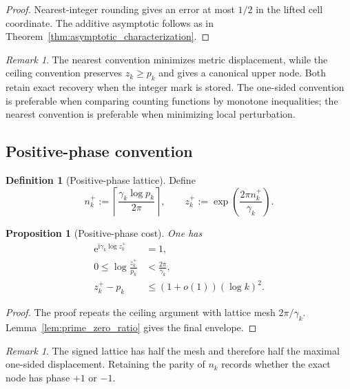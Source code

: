 \documentclass[11pt]{amsart}
\numberwithin{equation}{section}
\theoremstyle{plain}
\newtheorem{proposition}[theorem]{Proposition}
\theoremstyle{definition}
\newtheorem{definition}[theorem]{Definition}
\theoremstyle{remark}
\newtheorem{remark}[theorem]{Remark}
\newcommand{\e}{\mathrm e}
\newcommand{\ii}{\mathrm i}
\begin{document}
\begin{proof}
Nearest-integer rounding gives an error at most $1/2$ in the lifted cell
coordinate.  The additive asymptotic follows as in
Theorem~\ref{thm:asymptotic_characterization}.
\end{proof}

\begin{remark}
\label{rem:choice_comparison}
The nearest convention minimizes metric displacement, while the ceiling
convention preserves $z_k\geq p_k$ and gives a canonical upper node.  Both
retain exact recovery when the integer mark is stored.  The one-sided
convention is preferable when comparing counting functions by monotone
inequalities; the nearest convention is preferable when minimizing local
perturbation.
\end{remark}

\subsection{Positive-phase convention}
\label{subsec:positive_phase}

\begin{definition}[Positive-phase lattice]
\label{def:positive_phase_lattice}
Define
\begin{equation}
 n_k^{+}
 :=\left\lceil\frac{\gamma_k\log p_k}{2\pi}\right\rceil,
 \qquad
 z_k^{+}
 :=\exp\left(\frac{2\pi n_k^{+}}{\gamma_k}\right).
 \label{eq:positive_phase_definition}
\end{equation}
\end{definition}

\begin{proposition}[Positive-phase cost]
\label{prop:positive_phase_cost}
One has
\begin{align}
 \e^{\ii\gamma_k\log z_k^{+}}&=1,
 \label{eq:positive_phase_identity}
 \\
 0\leq\log\frac{z_k^{+}}{p_k}&<\frac{2\pi}{\gamma_k},
 \label{eq:positive_phase_log_bound}
 \\
 z_k^{+}-p_k&\leq(1+o(1))(\log k)^2.
 \label{eq:positive_phase_additive_envelope}
\end{align}
\end{proposition}

\begin{proof}
The proof repeats the ceiling argument with lattice mesh $2\pi/\gamma_k$.
Lemma~\ref{lem:prime_zero_ratio} gives the final envelope.
\end{proof}

\begin{remark}
\label{rem:signed_preferred}
The signed lattice has half the mesh and therefore half the maximal one-sided
displacement.  Retaining the parity of $n_k$ records whether the exact node
has phase $+1$ or $-1$.
\end{remark}
\end{document}
